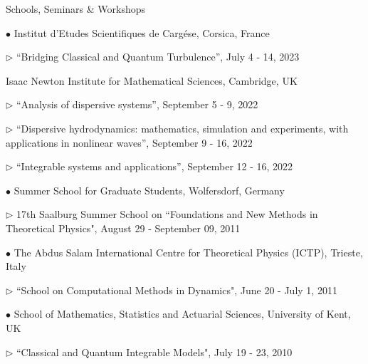 \documentclass[10pt]{article} %
\newenvironment{outerlist}[1][\enskip\textbullet]%
        {\begin{itemize}[#1]}{\end{itemize}%
         \vspace{-.6\baselineskip}}
\newenvironment{innerlist}[1][\enskip\textbullet]%
        {\begin{compactitem}[#1]}{\end{compactitem}}
\begin{document}
\begin{section}{Schools, Seminars \& Workshops}
\begin{outerlist} 
\item[$\bullet$] 
\vskip -7mm
Institut d'Etudes Scientifiques de Carg\'ese, Corsica, France
\begin{innerlist}
\item[$\triangleright$] ``Bridging Classical and Quantum Turbulence'', July 4 - 14, 2023
\end{innerlist}
\item Isaac Newton Institute for Mathematical Sciences, Cambridge, UK
\begin{innerlist}
\item[$\triangleright$] ``Analysis of dispersive systems'', September 5 - 9, 2022
\item[$\triangleright$] ``Dispersive hydrodynamics: mathematics, simulation and experiments, %
with applications in nonlinear waves'', September 9 - 16, 2022
\item[$\triangleright$] ``Integrable systems and applications'', September 12 - 16, 2022
\end{innerlist}

\item[$\bullet$] 
Summer School for Graduate Students, Wolfersdorf, Germany
\begin{innerlist}
\item[$\triangleright$] 17th Saalburg  Summer School on ``Foundations and New Methods in 
Theoretical Physics", August 29 - September 09, 2011
\end{innerlist}

\item[$\bullet$] The Abdus Salam International Centre for Theoretical Physics (ICTP), Trieste, Italy
\begin{innerlist}
\item[$\triangleright$] ``School on Computational Methods in Dynamics", June 20 - July 1, 2011
\end{innerlist}

\item[$\bullet$] School of Mathematics, Statistics and Actuarial Sciences, University of Kent, UK
\begin{innerlist}
\item[$\triangleright$] ``Classical and Quantum Integrable Models", July 19 - 23, 2010
\end{innerlist}

\end{outerlist}

\end{section}
\end{document}
